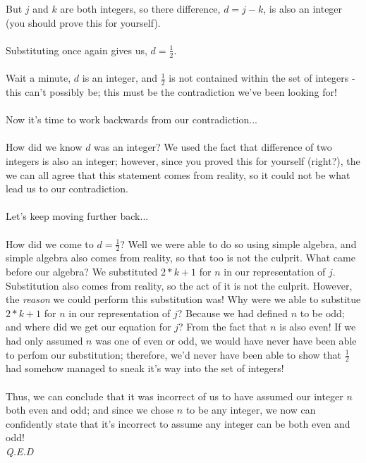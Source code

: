\documentclass[a4paper,12pt]{article}
\begin{document}
But $j$ and $k$ are both integers, so there difference, $d = j - k$, is also an integer (you should prove this for yourself).\\
\\ 
Substituting once again gives us, $d = \frac{1}{2}$.\\
\\
Wait a minute, $d$ is an integer, and $\frac{1}{2}$ is not contained within the set of integers - this can't possibly be; this must be the contradiction we've been looking for!\\
\\
Now it's time to work backwards from our contradiction...\\
\\
How did we know $d$ was an integer? We used the fact that difference of two integers is also an integer; however, since you proved this for yourself (right?), the we can all agree that this statement comes from reality, so it could not be what lead us to our contradiction.\\ 
\\
Let's keep moving further back...\\
\\
How did we come to $d = \frac{1}{2}$? Well we were able to do so using simple algebra, and simple algebra also comes from reality, so that too is not the culprit. What came before our algebra? We substituted $2*k + 1$ for $n$ in our representation of $j$. Substitution also comes from reality, so the act of it is not the culprit. However, the \textit{reason} we could perform this substitution was! Why were we able to substitue $2*k + 1$ for $n$ in our representation of $j$? Because we had defined $n$ to be odd; and where did we get our equation for $j$? From the fact that $n$ is also even! If we had only assumed $n$ was one of even or odd, we would have never have been able to perfom our substitution; therefore, we'd never have been able to show that $\frac{1}{2}$ had somehow managed to sneak it's way into the set of integers!\\
\\
Thus, we can conclude that it was incorrect of us to have assumed our integer $n$ both even and odd; and since we chose $n$ to be any integer, we now can confidently state that it's incorrect to assume any integer can be both even and odd!\\
\textit{Q.E.D}   
\end{document}
